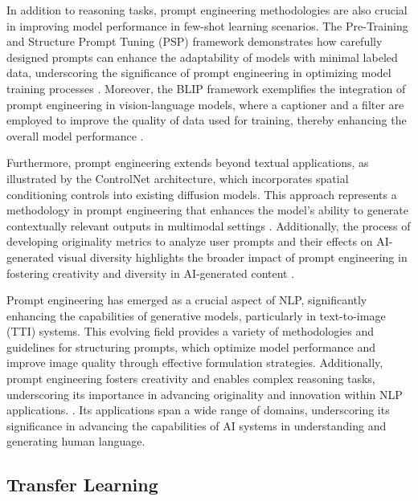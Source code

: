 In addition to reasoning tasks, prompt engineering methodologies are also crucial in improving model performance in few-shot learning scenarios. The Pre-Training and Structure Prompt Tuning (PSP) framework demonstrates how carefully designed prompts can enhance the adaptability of models with minimal labeled data, underscoring the significance of prompt engineering in optimizing model training processes \cite{ge2024psppretrainingstructureprompt}. Moreover, the BLIP framework exemplifies the integration of prompt engineering in vision-language models, where a captioner and a filter are employed to improve the quality of data used for training, thereby enhancing the overall model performance \cite{BLIP:Boots3}.



Furthermore, prompt engineering extends beyond textual applications, as illustrated by the ControlNet architecture, which incorporates spatial conditioning controls into existing diffusion models. This approach represents a methodology in prompt engineering that enhances the model's ability to generate contextually relevant outputs in multimodal settings \cite{zhang2023adding}. Additionally, the process of developing originality metrics to analyze user prompts and their effects on AI-generated visual diversity highlights the broader impact of prompt engineering in fostering creativity and diversity in AI-generated content \cite{palmini2024patternscreativityuserinput}.



Prompt engineering has emerged as a crucial aspect of NLP, significantly enhancing the capabilities of generative models, particularly in text-to-image (TTI) systems. This evolving field provides a variety of methodologies and guidelines for structuring prompts, which optimize model performance and improve image quality through effective formulation strategies. Additionally, prompt engineering fosters creativity and enables complex reasoning tasks, underscoring its importance in advancing originality and innovation within NLP applications. \cite{palmini2024patternscreativityuserinput,tang2023mvpmultitasksupervisedpretraining}. Its applications span a wide range of domains, underscoring its significance in advancing the capabilities of AI systems in understanding and generating human language.



\subsection{Transfer Learning} \label{subsec:Transfer Learning}

